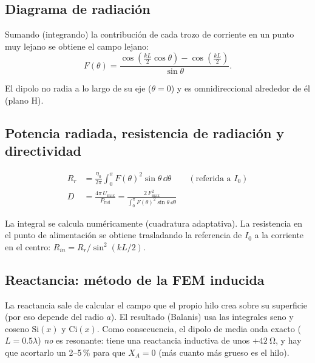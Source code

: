 \subsection{Diagrama de radiación}
Sumando (integrando) la contribución de cada trozo de corriente en un punto muy lejano se obtiene el campo lejano:
\begin{equation}
  F(\theta) = \frac{\cos\!\left(\frac{kL}{2}\cos\theta\right) - \cos\!\left(\frac{kL}{2}\right)}{\sin\theta} .
\end{equation}
\begin{donde}
\end{donde}
El dipolo no radia a lo largo de su eje ($\theta = 0$) y es omnidireccional alrededor de él (plano H).

\subsection{Potencia radiada, resistencia de radiación y directividad}
\begin{align}
  R_r &= \frac{\eta_0}{2\pi}\int_0^{\pi} F(\theta)^2\sin\theta\,\dd\theta \qquad(\text{referida a } I_0)\\
  D &= \frac{4\pi\,U_{\max}}{P_{\text{rad}}} = \frac{2\,F_{\max}^2}{\int_0^\pi F(\theta)^2\sin\theta\,\dd\theta}
\end{align}
\begin{donde}
\end{donde}
La integral se calcula numéricamente (cuadratura adaptativa). La resistencia en el punto de alimentación se obtiene trasladando la
referencia de $I_0$ a la corriente en el centro: $R_{in} = R_r/\sin^2(kL/2)$.

\subsection{Reactancia: método de la FEM inducida}
La reactancia sale de calcular el campo que el propio hilo crea sobre su superficie (por eso depende del radio $a$). El resultado
(Balanis) usa las integrales seno y coseno $\mathrm{Si}(x)$ y $\mathrm{Ci}(x)$. Como consecuencia, el dipolo de media onda exacto
($L = 0.5\lambda$) \emph{no} es resonante: tiene una reactancia inductiva de unos $+\SI{42}{\ohm}$, y hay que acortarlo un 2--5\,\% para
que $X_A = 0$ (más cuanto más grueso es el hilo).

